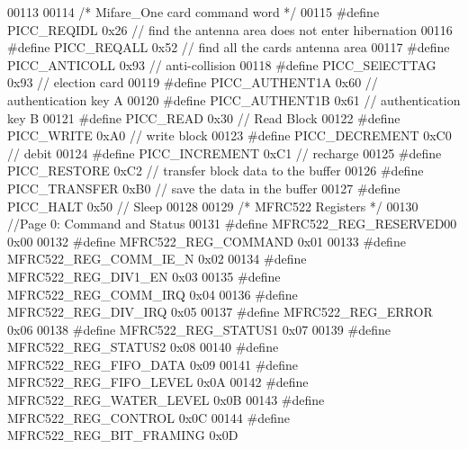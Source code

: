 \begin{DoxyCode}
00113 
00114 \textcolor{comment}{/* Mifare\_One card command word */}
00115 \textcolor{preprocessor}{#define PICC\_REQIDL                     0x26   // find the antenna area does not enter hibernation}
00116 \textcolor{preprocessor}{#define PICC\_REQALL                     0x52   // find all the cards antenna area}
00117 \textcolor{preprocessor}{#define PICC\_ANTICOLL                   0x93   // anti-collision}
00118 \textcolor{preprocessor}{#define PICC\_SElECTTAG                  0x93   // election card}
00119 \textcolor{preprocessor}{#define PICC\_AUTHENT1A                  0x60   // authentication key A}
00120 \textcolor{preprocessor}{#define PICC\_AUTHENT1B                  0x61   // authentication key B}
00121 \textcolor{preprocessor}{#define PICC\_READ                       0x30   // Read Block}
00122 \textcolor{preprocessor}{#define PICC\_WRITE                      0xA0   // write block}
00123 \textcolor{preprocessor}{#define PICC\_DECREMENT                  0xC0   // debit}
00124 \textcolor{preprocessor}{#define PICC\_INCREMENT                  0xC1   // recharge}
00125 \textcolor{preprocessor}{#define PICC\_RESTORE                    0xC2   // transfer block data to the buffer}
00126 \textcolor{preprocessor}{#define PICC\_TRANSFER                   0xB0   // save the data in the buffer}
00127 \textcolor{preprocessor}{#define PICC\_HALT                       0x50   // Sleep}
00128 
00129 \textcolor{comment}{/* MFRC522 Registers */}
00130 \textcolor{comment}{//Page 0: Command and Status}
00131 \textcolor{preprocessor}{#define MFRC522\_REG\_RESERVED00          0x00    }
00132 \textcolor{preprocessor}{#define MFRC522\_REG\_COMMAND             0x01    }
00133 \textcolor{preprocessor}{#define MFRC522\_REG\_COMM\_IE\_N           0x02    }
00134 \textcolor{preprocessor}{#define MFRC522\_REG\_DIV1\_EN             0x03    }
00135 \textcolor{preprocessor}{#define MFRC522\_REG\_COMM\_IRQ            0x04    }
00136 \textcolor{preprocessor}{#define MFRC522\_REG\_DIV\_IRQ             0x05}
00137 \textcolor{preprocessor}{#define MFRC522\_REG\_ERROR               0x06    }
00138 \textcolor{preprocessor}{#define MFRC522\_REG\_STATUS1             0x07    }
00139 \textcolor{preprocessor}{#define MFRC522\_REG\_STATUS2             0x08    }
00140 \textcolor{preprocessor}{#define MFRC522\_REG\_FIFO\_DATA           0x09}
00141 \textcolor{preprocessor}{#define MFRC522\_REG\_FIFO\_LEVEL          0x0A}
00142 \textcolor{preprocessor}{#define MFRC522\_REG\_WATER\_LEVEL         0x0B}
00143 \textcolor{preprocessor}{#define MFRC522\_REG\_CONTROL             0x0C}
00144 \textcolor{preprocessor}{#define MFRC522\_REG\_BIT\_FRAMING         0x0D}

\end{DoxyCode}
